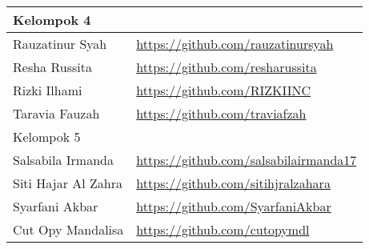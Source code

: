\documentclass[a4paper]{tufte-handout}
\begin{document}
\begin{projects}
\begin{description}
\begin{table}[!ht]
\begin{tabular}{ll}
\midrule
Kelompok 4\\
\midrule
Rauzatinur Syah			& \url{https://github.com/rauzatinursyah} \\
Resha Russita			& \url{https://github.com/resharussita} \\
Rizki Ilhami			& \url{https://github.com/RIZKIINC} \\
Taravia Fauzah			& \url{https://github.com/traviafzah} \\
\midrule
Kelompok 5\\
\midrule
Salsabila Irmanda		& \url{https://github.com/salsabilairmanda17} \\
Siti Hajar Al Zahra		& \url{https://github.com/sitihjralzahara} \\
Syarfani Akbar			& \url{https://github.com/SyarfaniAkbar} \\
Cut Opy Mandalisa		& \url{https://github.com/cutopymdl} \\
\midrule
\end{tabular}
\end{table}
\end{description}
\end{projects}

\end{document}
